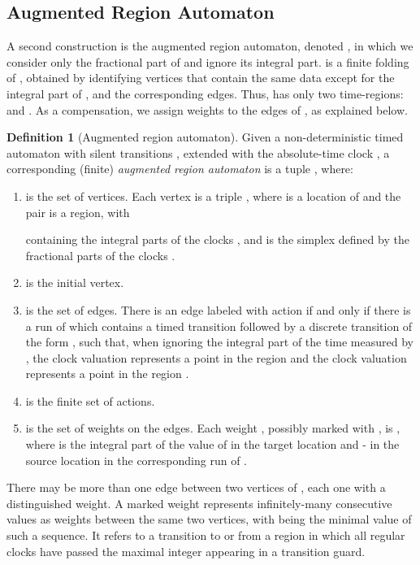 \documentclass[11pt]{amsart}
\theoremstyle{definition}
\newtheorem{definition}[theorem]{Definition}
\begin{document}
\subsection{Augmented Region Automaton}
A second construction is the augmented region automaton, denoted , in which we consider only the fractional part of  and ignore its integral part.
 is a finite folding of , obtained by identifying vertices that contain the same data except for the integral part of , and the corresponding edges. Thus,  has only two time-regions:  and .
As a compensation, we assign weights to the edges of , as explained below.


\begin{definition}[Augmented region automaton]
	\label{def:aug_region_automaton}
	Given a non-deterministic timed automaton with silent transitions , extended with the absolute-time clock , a corresponding (finite) \emph{augmented region automaton}  is a tuple , where:
	\begin{enumerate}
		\item  is the set of vertices.
		Each vertex is a triple ,	where  is a location of  and the pair  is a region, with
		
		containing the integral parts of the clocks , and 
		is the simplex defined by the fractional parts of the clocks .
		\item  is the initial vertex.
		\item  is the set of edges.
		There is an edge  labeled with action  if and only if there is a run of   which contains a timed transition followed by a discrete transition of the form , such that, when ignoring the integral part of the time measured by , the clock valuation  represents a point in the region  and the clock valuation  represents a point in the region .
		
		\item  is the finite set of actions.
		\item  is the set of weights on the edges.
		Each weight , possibly marked with , is , where  is the integral part of the value of  in the target location and  - in the source location in the corresponding run of .
	\end{enumerate}
\end{definition}
	There may be more than one edge between two vertices of , each one with a distinguished weight.
	A marked weight  represents infinitely-many consecutive values  as weights between the same two vertices, with  being the minimal value of such a sequence.
	It refers to a transition to or from a region  in which all regular clocks have passed the maximal integer  appearing in a transition guard.
\end{document}
